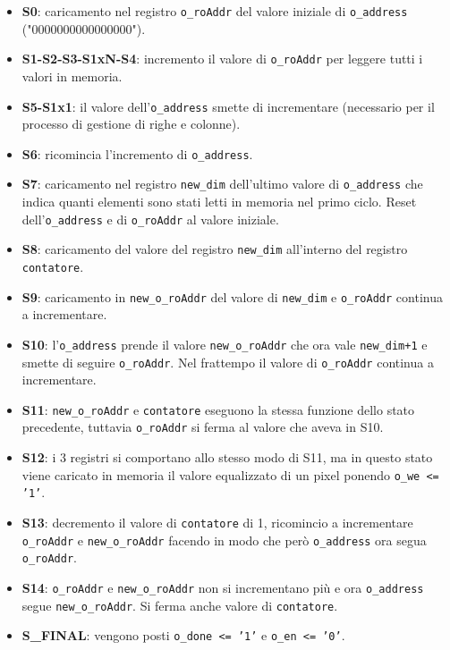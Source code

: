 \documentclass[12pt, table, xcdraw]{article}
\begin{document}
\begin{itemize}
\item \textbf{S0}: caricamento nel registro \texttt{o\_roAddr} del valore iniziale di \texttt{o\_address} ("0000000000000000").
\item \textbf{S1-S2-S3-S1xN-S4}: incremento il valore di \texttt{o\_roAddr} per leggere tutti i valori in memoria.
\item \textbf{S5-S1x1}: il valore dell'\texttt{o\_address} smette di incrementare (necessario per il processo di gestione di righe e colonne).
\item \textbf{S6}: ricomincia l'incremento di \texttt{o\_address}.
\item \textbf{S7}: caricamento nel registro \texttt{new\_dim} dell'ultimo valore di \texttt{o\_address} che indica quanti elementi sono stati letti in memoria nel primo ciclo. Reset dell'\texttt{o\_address} e di \texttt{o\_roAddr} al valore iniziale.
\item \textbf{S8}: caricamento del valore del registro \texttt{new\_dim} all'interno del registro  \texttt{contatore}.
\item \textbf{S9}: caricamento in \texttt{new\_o\_roAddr} del valore di \texttt{new\_dim} e \texttt{o\_roAddr} continua a incrementare.
\item \textbf{S10}: l'\texttt{o\_address} prende il valore \texttt{new\_o\_roAddr} che ora vale \texttt{new\_dim+1} e smette di seguire \texttt{o\_roAddr}. Nel frattempo il valore di \texttt{o\_roAddr} continua a incrementare.
\item \textbf{S11}: \texttt{new\_o\_roAddr} e \texttt{contatore} eseguono la stessa funzione dello stato precedente, tuttavia \texttt{o\_roAddr} si ferma al valore che aveva in S10.
\item \textbf{S12}: i 3 registri si comportano allo stesso modo di S11, ma in questo stato viene caricato in memoria il valore equalizzato di un pixel ponendo \texttt{o\_we \textless = '1'}.
\item \textbf{S13}: decremento il valore di \texttt{contatore} di 1, ricomincio a incrementare \texttt{o\_roAddr} e \texttt{new\_o\_roAddr} facendo in modo che però \texttt{o\_address} ora segua \texttt{o\_roAddr}.
\item \textbf{S14}: \texttt{o\_roAddr} e \texttt{new\_o\_roAddr} non si incrementano più e ora \texttt{o\_address} segue \texttt{new\_o\_roAddr}. Si ferma anche valore di \texttt{contatore}.
\item \textbf{S\_FINAL}: vengono posti \texttt{o\_done \textless = '1'} e \texttt{o\_en \textless = '0'}.
\end{itemize}
\end{document}

